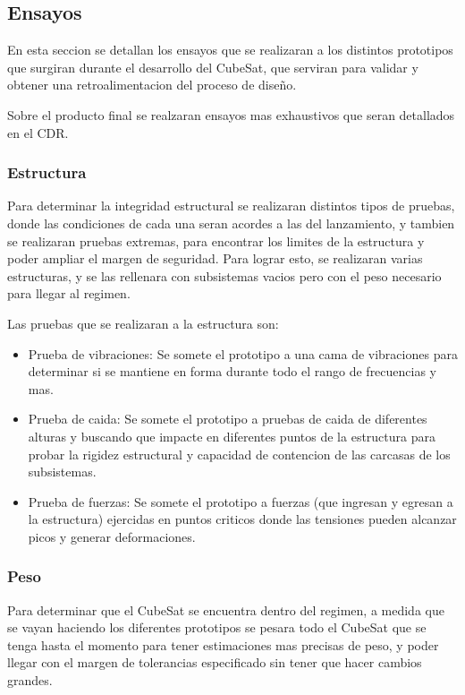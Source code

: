   \subsection{Ensayos}
    En esta seccion se detallan los ensayos que se realizaran a los distintos prototipos que surgiran durante el
    desarrollo del CubeSat, que serviran para validar y obtener una retroalimentacion del proceso de diseño.

    Sobre el producto final se realzaran ensayos mas exhaustivos que seran detallados en el CDR.

    \subsubsection{Estructura}
      Para determinar la integridad estructural se realizaran distintos tipos de pruebas, donde las condiciones de cada
      una seran acordes a las del lanzamiento, y tambien se realizaran pruebas extremas, para encontrar los limites de
      la estructura y poder ampliar el margen de seguridad. Para lograr esto, se realizaran varias estructuras, y se las
      rellenara con subsistemas vacios pero con el peso necesario para llegar al regimen.

      Las pruebas que se realizaran a la estructura son:
      \begin{itemize}
        \item Prueba de vibraciones: Se somete el prototipo a una cama de vibraciones para determinar si se mantiene en
          forma durante todo el rango de frecuencias y mas.
        \item Prueba de caida: Se somete el prototipo a pruebas de caida de diferentes alturas y buscando que impacte en
          diferentes puntos de la estructura para probar la rigidez estructural y capacidad de contencion de las
          carcasas de los subsistemas.
        \item Prueba de fuerzas: Se somete el prototipo a fuerzas (que ingresan y egresan a la estructura) ejercidas en
          puntos criticos donde las tensiones pueden alcanzar picos y generar deformaciones.
      \end{itemize}
    \subsubsection{Peso}
      Para determinar que el CubeSat se encuentra dentro del regimen, a medida que se vayan haciendo los diferentes
      prototipos se pesara todo el CubeSat que se tenga hasta el momento para tener estimaciones mas precisas de peso, y
      poder llegar con el margen de tolerancias especificado sin tener que hacer cambios grandes.


